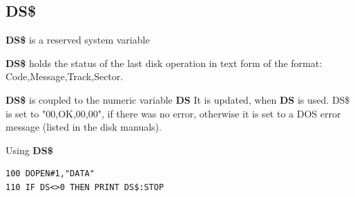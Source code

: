 
\newpage
\subsection{DS\$}
\begin{description}[leftmargin=2cm,style=nextline]
\item [Format:] {\bf DS\$} is a reserved system variable
\item [Usage:]  {\bf DS\$} holds the status of the last disk operation
                in text form of the format:
                Code,Message,Track,Sector.

                {\bf DS\$} is coupled to the numeric variable {\bf DS}
                It is updated, when {\bf DS} is used.
                DS\$ is set to "00,OK,00,00", if there was no error, otherwise
                it is set to a DOS error message (listed in the
                disk manuals).

\item [Example:] Using {\bf DS\$}
\begin{tcolorbox}[colback=black,coltext=white]
\verbatimfont{\codefont}
\begin{verbatim}
100 DOPEN#1,"DATA"
110 IF DS<>0 THEN PRINT DS$:STOP
\end{verbatim}
\end{tcolorbox}
\end{description}


\newpage
